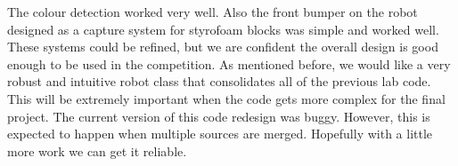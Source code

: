 \documentclass[twocolumn]{article}
\begin{document}
The colour detection worked very well. Also the front bumper on the robot designed as a capture system for styrofoam blocks was simple and worked well. These systems could be refined, but we are confident the overall design is good enough to be used in the competition. As mentioned before, we would like a very robust and intuitive robot class that consolidates all of the previous lab code. This will be extremely important when the code gets more complex for the final project. The current version of this code redesign was buggy. However, this is expected to happen when multiple sources are merged. Hopefully with a little more work we can get it reliable.


\end{document}
